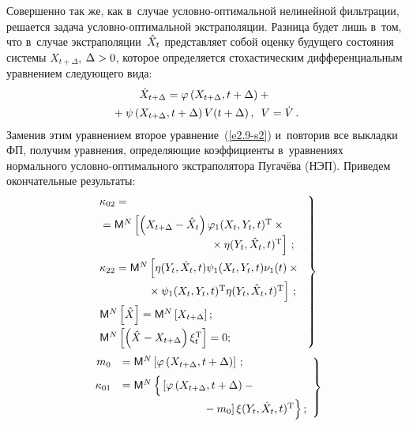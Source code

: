 \begin{multicols}{2}
Совершенно так же, как в~случае услов\-но-оп\-ти\-маль\-ной нелинейной фильтрации, 
решается задача услов\-но-оп\-ти\-маль\-ной экстраполяции. Разница будет
лишь в~том, что в~случае экстраполяции~$\hat X_t$ представляет собой
оценку будущего состояния системы  $X_{t+\Delta}$, $\Delta \hm>0$, которое
определяется стохастическим дифференциальным
уравнением следующего вида:
\begin{multline}
\dot X_{t+\Delta}=\varphi \left(X_{t+\Delta}, t+\Delta\right) +{}\\
{}+\psi \left(X_{t+\Delta}, t+\Delta \right) V(t+\Delta)\,,\enskip 
V=\dot V\,.\label{e7.4-s2}
\end{multline}
Заменив этим уравнением второе уравнение~(\ref{e2.9-s2}) и~повторив все
выкладки ФП, получим уравнения, определяющие коэффициенты 
в~уравнениях нормального услов\-но-оп\-ти\-маль\-но\-го экстраполятора Пугачёва
(НЭП). Приведем окончательные  результаты:
\begin{equation}
\left.
\begin{array}{l}
\kappa_{02} ={}\\[6pt]
{}= \mm^N\left[ \left(X_{t+\Delta} - \hat X_t\right) \varphi_1 
    \yxtt^{\mathrm{T}} \times{}\right.\\
   \left. \hspace*{35mm}{}\times \eta\yutt^{\mathrm{T}}\right]\,;
\\[6pt]
    \kappa_{22} = \mm^N
    \left[\eta\yutt\psi_1\yxtt\nu_1(t)\times{}\right.\\[6pt]
    \left.{}\hspace*{15mm}\times \psi_1\yxtt^{\mathrm{T}} 
    \eta\yutt^{\mathrm{T}}\right]\,;
\\[6pt]
\mm^N \lk \hx\rk = \mm^N \lk X_{t+\Delta}\rk;\\[6pt] 
\mm^N\lk\left(\hx - X_{t+\Delta}\right)\xi_t^{\mathrm{T}} \rk=0;
\end{array}
\right\}
\label{e7.5-s2}
\end{equation}
\begin{equation}
\left.
\begin{array}{rl}
m_0 &= \mm^N\lk \varphi \left(X_{t+\Delta}, t+\Delta\right)\rk \,;\\[6pt]
\kappa_{01} &= \mm^N\left\{ 
\vphantom{\xi\yutt^{\mathrm{T}}}
\left[ \varphi \left(X_{t+\Delta}, t+\Delta\right)-{}\right.\right.\\[6pt]
&\hspace*{25mm}\left.\left.{}- m_0\right] \xi\yutt^{\mathrm{T}}\right\};
\end{array}
\right\}
\label{e7.6-s2}
\end{equation}


\end{multicols}

